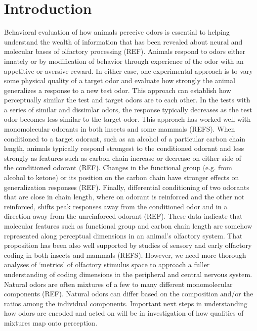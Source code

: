 \section*{Introduction}
\label{sec:introduction}

Behavioral evaluation of how animals perceive odors is essential to helping understand the wealth of information that has been revealed about neural and molecular bases of olfactory processing (REF). 
Animals respond to odors either innately or by modification of behavior through experience of the odor with an appetitive or aversive reward. 
In either case, one experimental approach is to vary some physical quality of a target odor and evaluate how strongly the animal generalizes a response to a new test odor. 
This approach can establish how perceptually similar the test and target odors are to each other. 
In the tests with a series of similar and dissimlar odors, the response typically decreases as the test odor becomes less similar to the target odor. 
This approach has worked well with monomolecular odorants in both insects and some mammals (REFS). 
When conditioned to a target odorant, such as an alcohol of a particular carbon chain length, animals typically respond strongest to the conditioned odorant and less strongly as features such as carbon chain increase or decrease on either side of the conditioned odorant (REF). 
Changes in the functional group (e.g. from alcohol to ketone) or its position on the carbon chain have stronger effects on generalization responses (REF). 
Finally, differential conditioning of two odorants that are close in chain length, where on odorant is reinforced and the other not reinforced, shifts peak responses away from the conditioned odor and in a direction away from the unreinforced odorant (REF). 
These data indicate that molecular features such as functional group and carbon chain length are somehow represented along perceptual dimensions in an animal’s olfactory system. 
That proposition has been also well supported by studies of sensory and early olfactory coding in both insects and mammals (REFS). 
 However, we need more thorough analyses of ‘metrics’ of olfactory stimulus space to approach a fuller understanding of coding dimensions in the peripheral and central nervous system. 
 Natural odors are often mixtures of a few to many different monomolecular components (REF). 
 Natural odors can differ based on the composition and/or the ratios among the individual components. 
 Important next steps in understanding how odors are encoded and acted on will be in investigation of how qualities of mixtures map onto perception. 

